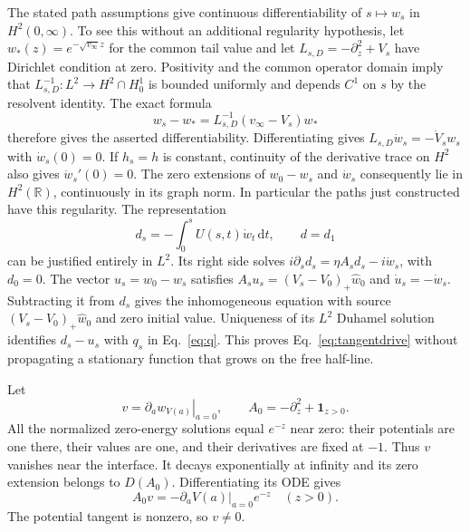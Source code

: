 \documentclass[aps,pra,reprint,superscriptaddress,longbibliography]{revtex4-2}
\newcommand{\dd}{\mathrm d}
\newcommand{\R}{\mathbb R}
\begin{document}
The stated path assumptions give continuous differentiability of
$s\mapsto w_s$ in $H^2(0,\infty)$. To see this without an additional
regularity hypothesis, let $w_*(z)=e^{-\sqrt{v_\infty}z}$ for the
common tail value and let $L_{s,D}=-\partial_z^2+V_s$ have Dirichlet
condition at zero. Positivity and the common operator domain imply
that $L_{s,D}^{-1}:L^2\to H^2\cap H_0^1$ is bounded uniformly and
depends $C^1$ on $s$ by the resolvent identity. The exact formula
\[
 w_s-w_*=L_{s,D}^{-1}(v_\infty-V_s)w_*
\]
therefore gives the asserted differentiability. Differentiating gives
$L_{s,D}\dot w_s=-\dot V_sw_s$ with $\dot w_s(0)=0$.
If $h_s=h$ is constant, continuity of the derivative trace on $H^2$
also gives $\dot w_s'(0)=0$. The zero extensions of $w_0-w_s$ and
$\dot w_s$ consequently lie in $H^2(\R)$, continuously in its graph
norm. In particular the paths just constructed have this regularity.
The representation
\begin{equation}
 d_s=-\int_0^sU(s,t)\dot w_t\,\dd t,
 \qquad d=d_1
 \label{eq:corecalibrateddisturbance}
\end{equation}
can be justified entirely in $L^2$. Its right side solves
$i\partial_sd_s=\eta A_sd_s-i\dot w_s$, with $d_0=0$.
The vector $u_s=w_0-w_s$ satisfies
$A_su_s=(V_s-V_0)_+\widehat w_0$ and $\dot u_s=-\dot w_s$.
Subtracting it from $d_s$ gives the inhomogeneous equation with source
$(V_s-V_0)_+\widehat w_0$ and zero initial value. Uniqueness of its
$L^2$ Duhamel solution identifies $d_s-u_s$ with $q_s$ in
Eq.~\eqref{eq:q}. This proves Eq.~\eqref{eq:tangentdrive} without
propagating a stationary function that grows on the free half-line.

Let
\begin{equation}
 v=\left.\partial_aw_{V(a)}\right|_{a=0},\qquad
 A_0=-\partial_z^2+\mathbf1_{z>0}.
 \label{eq:corejetwalltangent}
\end{equation}
All the normalized zero-energy solutions equal $e^{-z}$ near zero:
their potentials are one there, their values are one, and their
derivatives are fixed at $-1$. Thus $v$ vanishes near the interface.
It decays exponentially at infinity and its zero extension belongs
to $D(A_0)$. Differentiating its ODE gives
\begin{equation}
 A_0v=-\left.\partial_aV(a)\right|_{a=0}e^{-z}
 \quad(z>0).
 \label{eq:corenonzerotangent}
\end{equation}
The potential tangent is nonzero, so $v\ne0$.
\end{document}
